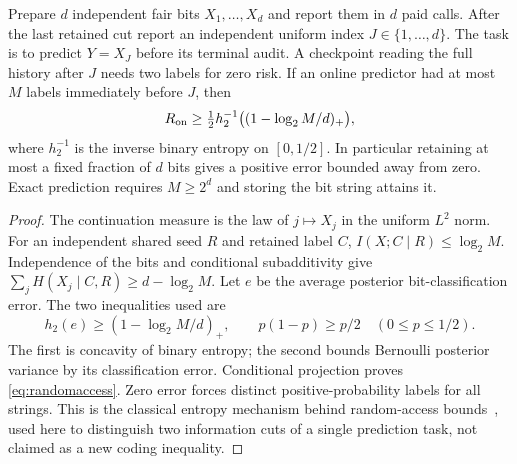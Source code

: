 \begin{example}\label{ex:query}
Prepare $d$ independent fair bits $X_1,\ldots,X_d$ and report them in $d$ paid calls. After the last retained cut report an independent uniform index $J\in\{1,\ldots,d\}$. The task is to predict $Y=X_J$ before its terminal audit. A checkpoint reading the full history after $J$ needs two labels for zero risk. If an online predictor had at most $M$ labels immediately before $J$, then
\begin{equation}\label{eq:randomaccess}
 R_{\mathrm{on}}\ge\tfrac12 h_2^{-1}\bigl((1-\log_2 M/d)_+\bigr),
\end{equation}
where $h_2^{-1}$ is the inverse binary entropy on $[0,1/2]$. In particular retaining at most a fixed fraction of $d$ bits gives a positive error bounded away from zero. Exact prediction requires $M\ge2^d$ and storing the bit string attains it.
\end{example}
\begin{proof}
The continuation measure is the law of $j\mapsto X_j$ in the uniform $L^2$ norm. For an independent shared seed $R$ and retained label $C$, $I(X;C\mid R)\le\log_2 M$. Independence of the bits and conditional subadditivity give
$\sum_j H(X_j\mid C,R)\ge d-\log_2M$.
Let $e$ be the average posterior bit-classification error. The two inequalities used are
\[
 h_2(e)\ge(1-\log_2M/d)_+,\qquad
 p(1-p)\ge p/2\quad(0\le p\le1/2).
\]
The first is concavity of binary entropy; the second bounds Bernoulli posterior variance by its classification error. Conditional projection proves \eqref{eq:randomaccess}. Zero error forces distinct positive-probability labels for all strings. This is the classical entropy mechanism behind random-access bounds~\cite{nayak}, used here to distinguish two information cuts of a single prediction task, not claimed as a new coding inequality.
\end{proof}

